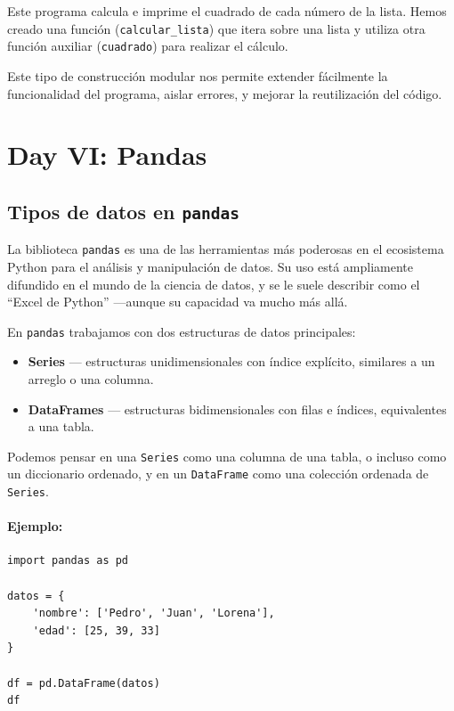 \documentclass{article}
\theoremstyle{nonumberplain}
\begin{document}
Este programa calcula e imprime el cuadrado de cada número de la lista. Hemos creado una función (\texttt{calcular\_lista}) que itera sobre una lista y utiliza otra función auxiliar (\texttt{cuadrado}) para realizar el cálculo.

Este tipo de construcción modular nos permite extender fácilmente la funcionalidad del programa, aislar errores, y mejorar la reutilización del código.

\section*{Day VI: Pandas}

\subsection*{Tipos de datos en \texttt{pandas}}

La biblioteca \texttt{pandas} es una de las herramientas más poderosas en el ecosistema Python para el análisis y manipulación de datos. Su uso está ampliamente difundido en el mundo de la ciencia de datos, y se le suele describir como el “Excel de Python” —aunque su capacidad va mucho más allá.

En \texttt{pandas} trabajamos con dos estructuras de datos principales:

\begin{itemize}
    \item \textbf{Series} — estructuras unidimensionales con índice explícito, similares a un arreglo o una columna.
    \item \textbf{DataFrames} — estructuras bidimensionales con filas e índices, equivalentes a una tabla.
\end{itemize}

Podemos pensar en una \texttt{Series} como una columna de una tabla, o incluso como un diccionario ordenado, y en un \texttt{DataFrame} como una colección ordenada de \texttt{Series}.

\paragraph{Ejemplo:}

\begin{verbatim}
import pandas as pd

datos = {
    'nombre': ['Pedro', 'Juan', 'Lorena'],
    'edad': [25, 39, 33]
}

df = pd.DataFrame(datos)
df
\end{verbatim}
\end{document}
